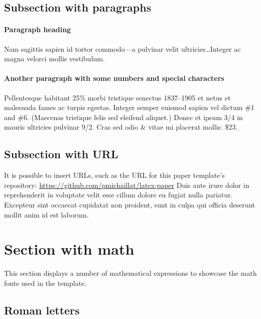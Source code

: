 \documentclass{article}
\begin{document}
\subsection{Subsection with paragraphs}

\paragraph{Paragraph heading} \wcTpLoremIpsum*[type=sentence,words-per-sentence=29,seed=114]{}  Nam sagittis sapien id tortor commodo---a pulvinar velit ultricies\ldots Integer ac magna velorci mollis vestibulum. \wcTpLoremIpsum*[type=sentence,words-per-sentence=11,seed=115]{}  

\paragraph{Another paragraph with some numbers and special characters} Pellentesque habitant 25\% morbi tristique senectus 1837--1905 et netus et malesuada fames ac turpis egestas. Integer semper euismod sapien vel dictum \#1 and \#6. \wcTpLoremIpsum*[type=sentence,words-per-sentence=7,seed=116]{}  (Maecenas tristique felis sed eleifend aliquet.) Donec et ipsum 3/4 in mauris ultricies pulvinar 9/2. \wcTpLoremIpsum*[type=sentence,words-per-sentence=7,seed=117]{}  Cras sed odio \& vitae mi placerat mollis: \$23.

\subsection{Subsection with URL}

It is possible to insert URLs, such as the URL for this paper template's repository: \url{https://github.com/pmichaillat/latex-paper} \wcTpLoremIpsum*[type=sentence,words-per-sentence=36,seed=118]{}  Duis aute irure dolor in reprehenderit in voluptate velit esse
cillum dolore eu fugiat nulla pariatur. Excepteur sint occaecat cupidatat non
proident, sunt in culpa qui officia deserunt mollit anim id est laborum.

\section{Section with math}\label{s:math}

This section displays a number of mathematical expressions to showcase the math fonts used in the template.

\subsection{Roman letters} 
\end{document}
